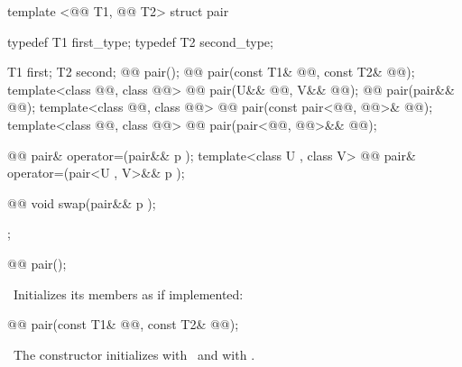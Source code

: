 \documentclass[american,twoside]{book}
\begin{document}
%
\begin{codeblock}
template <@@ T1, @@ T2>
struct pair {
  typedef T1 first_type;
  typedef T2 second_type;

  T1 first;
  T2 second;
  @@ pair();
  @@ pair(const T1& @@, const T2& @@);
  template<class @@, class @@>
    @@ 
    pair(U&& @@, V&& @@);
  @@ pair(pair&& @@);
  template<class @@, class @@> 
    @@
    pair(const pair<@@, @@>& @@);
  template<class @@, class @@> 
    @@
    pair(pair<@@, @@>&& @@);  
  
  @@ pair& operator=(pair&& p ); 
  template<class U , class V> 
    @@
    pair& operator=(pair<U , V>&& p );

  @@ void swap(pair&& p ); 
};
\end{codeblock}

\begin{itemdecl}
@@ pair();
\end{itemdecl}

\begin{itemdescr}
\pnum
\effects\ 
Initializes its members as if implemented: \
\end{itemdescr}

\begin{itemdecl}
@@ pair(const T1& @@, const T2& @@);
\end{itemdecl}

\begin{itemdescr}
\pnum
\effects\ 
The constructor initializes  with \ and 
with .
\end{itemdescr}
\end{document}
